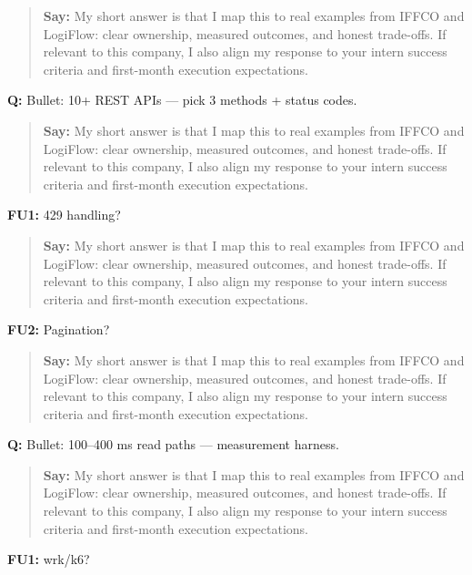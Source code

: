 \documentclass[9pt,a4paper]{article}
\begin{document}
\begin{quote}\small\textbf{Say:} My short answer is that I map this to real examples from IFFCO and LogiFlow: clear ownership, measured outcomes, and honest trade-offs. If relevant to this company, I also align my response to your intern success criteria and first-month execution expectations.\end{quote}
\vspace{2mm}
\textbf{Q:} Bullet: 10+ REST APIs --- pick 3 methods + status codes.

\begin{quote}\small\textbf{Say:} My short answer is that I map this to real examples from IFFCO and LogiFlow: clear ownership, measured outcomes, and honest trade-offs. If relevant to this company, I also align my response to your intern success criteria and first-month execution expectations.\end{quote}
\vspace{2mm}
\textbf{FU1:} 429 handling?

\begin{quote}\small\textbf{Say:} My short answer is that I map this to real examples from IFFCO and LogiFlow: clear ownership, measured outcomes, and honest trade-offs. If relevant to this company, I also align my response to your intern success criteria and first-month execution expectations.\end{quote}
\vspace{2mm}
\textbf{FU2:} Pagination?

\begin{quote}\small\textbf{Say:} My short answer is that I map this to real examples from IFFCO and LogiFlow: clear ownership, measured outcomes, and honest trade-offs. If relevant to this company, I also align my response to your intern success criteria and first-month execution expectations.\end{quote}
\vspace{2mm}
\textbf{Q:} Bullet: 100--400 ms read paths --- measurement harness.

\begin{quote}\small\textbf{Say:} My short answer is that I map this to real examples from IFFCO and LogiFlow: clear ownership, measured outcomes, and honest trade-offs. If relevant to this company, I also align my response to your intern success criteria and first-month execution expectations.\end{quote}
\vspace{2mm}
\textbf{FU1:} wrk/k6?
\end{document}

